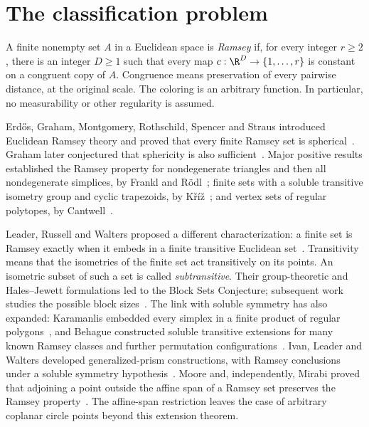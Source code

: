 \section{The classification problem}

A finite nonempty set $A$ in a Euclidean space is \emph{Ramsey} if, for
every integer $r\ge2$, there is an integer $D\ge1$ such that every map
$c:\R^D\to\{1,\ldots,r\}$ is constant on a congruent copy of $A$.
Congruence means preservation of every pairwise distance, at the original
scale. The coloring is an arbitrary function. In particular, no
measurability or other regularity is assumed.

Erd\H{o}s, Graham, Montgomery, Rothschild, Spencer and Straus introduced
Euclidean Ramsey theory and proved that every finite Ramsey set is
spherical~\cite[Theorem~13]{egm-rss}. Graham later conjectured that
sphericity is also sufficient~\cite{graham-survey}. Major positive
results established the Ramsey property for nondegenerate triangles
and then all nondegenerate simplices, by Frankl and
R\"odl~\cite{frankl-rodl-triangles,frankl-rodl-simplices}; finite sets
with a soluble transitive isometry group and cyclic trapezoids, by
K\v{r}\'i\v{z}~\cite{kriz-permutation,kriz-trapezoids}; and vertex sets
of regular polytopes, by Cantwell~\cite{cantwell-polytopes}.

Leader, Russell and Walters proposed a different characterization:
a finite set is Ramsey exactly when it embeds in a finite transitive
Euclidean set~\cite[Conjecture~A]{lrw-transitive}. Transitivity means
that the isometries of the finite set act transitively on its points.
An isometric subset of such a set is called \emph{subtransitive}.
Their group-theoretic and Hales--Jewett formulations led to the
Block Sets Conjecture; subsequent work studies the possible block
sizes~\cite{ilw-blocks}. The link with soluble symmetry has also
expanded: Karamanlis embedded every simplex in a finite product of
regular polygons~\cite{karamanlis-tori}, and Behague constructed
soluble transitive extensions for many known Ramsey classes and
further permutation configurations~\cite{behague-subsoluble}.
Ivan, Leader and Walters developed generalized-prism constructions,
with Ramsey conclusions under a soluble symmetry
hypothesis~\cite{ilw-prisms}. Moore and, independently, Mirabi proved
that adjoining a point outside the affine span of a Ramsey set
preserves the Ramsey property~\cite{moore-pyramid,mirabi-extensions}.
The affine-span restriction leaves the case of arbitrary coplanar
circle points beyond this extension theorem.


